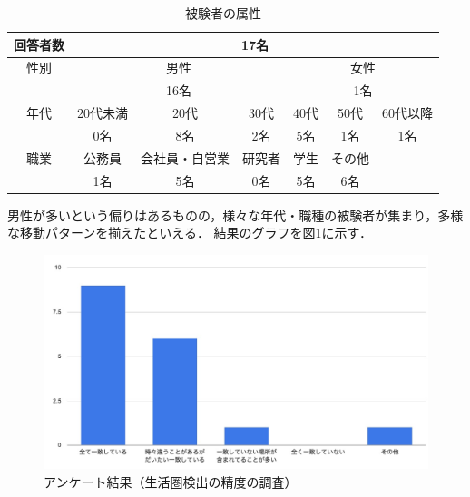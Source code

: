 \documentclass[a4paper]{jsarticle}
\begin{document}
\begin{table}[H]
  \begin{center}
    \caption{被験者の属性}
    \renewcommand\arraystretch{1.4}
    \begin{tabular}{|c|c|c|c|c|c|c|}
      \hline
      \multicolumn{1}{|l|}{回答者数} & \multicolumn{6}{c|}{17名} \\
      \hline
      性別 & \multicolumn{3}{c|}{男性}　& \multicolumn{3}{c|}{女性} \\
      \cline{2-7}
      & \multicolumn{3}{c|}{16名}　& \multicolumn{3}{c|}{1名} \\
      \hline
      年代 & 20代未満 & 20代 & 30代 & 40代 & 50代 & 60代以降 \\
      \cline{2-7}
      & 0名 & 8名 & 2名 & 5名 & 1名 & 1名 \\
      \hline
      職業 & 公務員 & 会社員・自営業 & 研究者 & 学生 & その他 &  \\
      \cline{2-7}
      & 1名 & 5名 & 0名 & 5名 & 6名 & \\
      \hline
    \end{tabular}
    \label{tab:system-test-userstatus}
  \end{center}
\end{table}

男性が多いという偏りはあるものの，様々な年代・職種の被験者が集まり，多様な移動パターンを揃えたといえる．
結果のグラフを図\ref{fig:system-result}に示す．

\fifigure
\begin{figure}[H]
  \begin{center}
    \includegraphics[width=0.9\hsize]{./images/system_result.jpg}
    \caption{アンケート結果（生活圏検出の精度の調査）}
    \label{fig:system-result}
  \end{center}
\end{figure}
\fi
\end{document}
